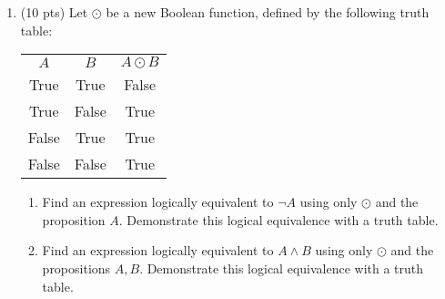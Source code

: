 \documentclass[14pt]{extarticle}
\begin{document}
\begin{enumerate}
\item (10 pts) 
Let $\odot$ be a new Boolean function, defined by the following truth table:
\begin{center}
\begin{tabular}{ |c|c|c| }
\hline
$A$ & $B$ & $A \odot B$ \\
True & True & False \\
True & False & True \\
False & True & True \\
False & False & True \\
\hline
\end{tabular}
\end{center}
\begin{enumerate}
\item Find an expression logically equivalent to $\neg A$ using only $\odot$ and the proposition $A$. Demonstrate this logical equivalence with a truth table.
\item Find an expression logically equivalent to $A \land B$ using only $\odot$ and the propositions $A, B$. Demonstrate this logical equivalence with a truth table.
\end{enumerate}
\end{enumerate}
\end{document}
